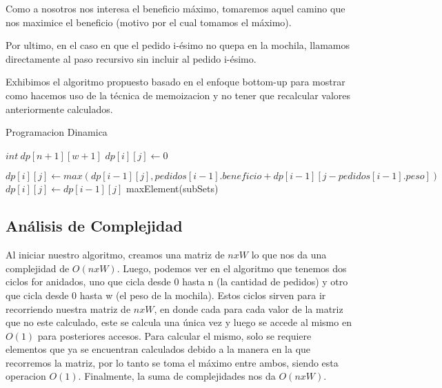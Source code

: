 Como a nosotros nos interesa el beneficio máximo, tomaremos aquel camino que nos maximice el beneficio (motivo por el cual tomamos el máximo).


Por ultimo, en el caso en que el pedido i-ésimo no quepa en la mochila, llamamos directamente al paso recursivo sin incluir al pedido i-ésimo.



Exhibimos el algoritmo propuesto basado en el enfoque bottom-up para mostrar como hacemos uso de la técnica de memoizacion y no tener que recalcular valores anteriormente calculados.

\begin{algorithm}
\caption{Programacion Dinamica}\label{selection}
\begin{algorithmic}[1]
	\State $int \ dp[n+1][w+1]$
    				\State $dp[i][j] \gets 0$
    			
    			\Else
					\State $dp[i][j] \gets max(dp[i-1][j], pedidos[i-1].beneficio + dp[i-1][j-pedidos[i-1].peso])$
				\Else
					\State $dp[i][j] \gets dp[i-1][j]$
				\EndIf
			\EndIf
		\EndFor
    \EndFor
   	\Return maxElement(subSets)
\EndProcedure
\end{algorithmic}
\end{algorithm}

\subsection*{Análisis de Complejidad}
Al iniciar nuestro algoritmo, creamos una matriz de $nxW$ lo que nos da una complejidad de $O(nxW)$.
Luego, podemos ver en el algoritmo que tenemos dos ciclos for anidados, uno que cicla desde 0 hasta n (la cantidad de pedidos) y otro que cicla desde 0 hasta w (el peso de la mochila). Estos ciclos sirven para ir recorriendo nuestra matriz de $nxW$, en donde cada para cada valor de la matriz que no este calculado, este se calcula una única vez y luego se accede al mismo en $O(1)$ para posteriores accesos. Para calcular el mismo, solo se requiere elementos que ya se encuentran calculados debido a la manera en la que recorremos la matriz, por lo tanto se toma el máximo entre ambos, siendo esta operacion $O(1)$. Finalmente, la suma de complejidades nos da $O(nxW)$.